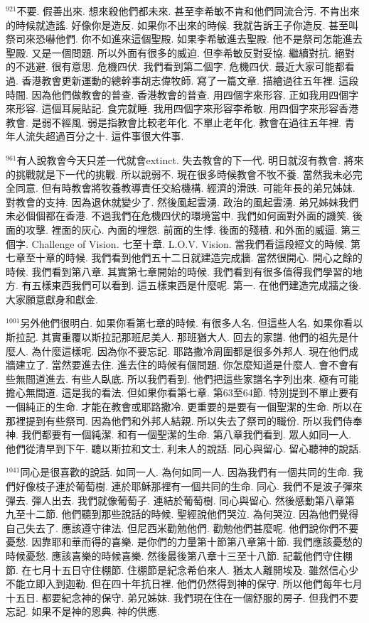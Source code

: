\documentclass{book}
\begin{document}
$^{921}$不要.
假善出來.
想來殺他們都未來.
甚至李希敏不肯和他們同流合污.
不肯出來的時候就造謠.
好像你是造反.
如果你不出來的時候.
我就告訴王子你造反.
甚至叫祭司來恐嚇他們.
你不如進來這個聖殿.
如果李希敏進去聖殿.
他不是祭司怎能進去聖殿.
又是一個問題.
所以外面有很多的威迫.
但李希敏反對妥協.
繼續對抗.
絕對的不逃避.
很有意思.
危機四伏.
我們看到第二個字.
危機四伏.
最近大家可能都看過.
香港教會更新運動的總幹事胡志偉牧師.
寫了一篇文章.
描繪過往五年裡.
這段時間.
因為他們做教會的普查.
香港教會的普查.
用四個字來形容.
正如我用四個字來形容.
這個耳屍貼記.
食完就睡.
我用四個字來形容李希敏.
用四個字來形容香港教會.
是弱不經風.
弱是指教會比較老年化.
不單止老年化.
教會在過往五年裡.
青年人流失超過百分之十.
這件事很大件事.

$^{961}$有人說教會今天只差一代就會extinct.
失去教會的下一代.
明日就沒有教會.
將來的挑戰就是下一代的挑戰.
所以說弱不.
現在很多時候教會不牧不養.
當然我未必完全同意.
但有時教會將牧養教導責任交給機構.
經濟的滑跌.
可能年長的弟兄姊妹.
對教會的支持.
因為退休就變少了.
然後風起雲湧.
政治的風起雲湧.
弟兄姊妹我們未必個個都在香港.
不過我們在危機四伏的環境當中.
我們如何面對外面的譏笑.
後面的攻擊.
裡面的灰心.
內面的埋怨.
前面的生悸.
後面的殘積.
和外面的威逼.
第三個字.
Challenge of Vision.
七至十章.
L.O.V. Vision.
當我們看這段經文的時候.
第七章至十章的時候.
我們看到他們五十二日就建造完成牆.
當然很開心.
開心之餘的時候.
我們看到第八章.
其實第七章開始的時候.
我們看到有很多值得我們學習的地方.
有五樣東西我們可以看到.
這五樣東西是什麼呢.
第一.
在他們建造完成牆之後.
大家願意獻身和獻金.

$^{1001}$另外他們很明白.
如果你看第七章的時候.
有很多人名.
但這些人名.
如果你看以斯拉記.
其實重覆以斯拉記那班尼美人.
那班猶大人.
回去的家譜.
他們的祖先是什麼人.
為什麼這樣呢.
因為你不要忘記.
耶路撒冷周圍都是很多外邦人.
現在他們成牆建立了.
當然要進去住.
進去住的時候有個問題.
你怎麼知道是什麼人.
會不會有些無間道進去.
有些人臥底.
所以我們看到.
他們把這些家譜名字列出來.
極有可能擔心無間道.
這是我的看法.
但如果你看第七章.
第63至64節.
特別提到不單止要有一個純正的生命.
才能在教會或耶路撒冷.
更重要的是要有一個聖潔的生命.
所以在那裡提到有些祭司.
因為他們和外邦人結親.
所以失去了祭司的職份.
所以我們侍奉神.
我們都要有一個純潔.
和有一個聖潔的生命.
第八章我們看到.
眾人如同一人.
他們從清早到下午.
聽以斯拉和文士.
利未人的說話.
同心與留心.
留心聽神的說話.

$^{1041}$同心是很喜歡的說話.
如同一人.
為何如同一人.
因為我們有一個共同的生命.
我們好像枝子連於葡萄樹.
連於耶穌那裡有一個共同的生命.
同心.
我們不是波子彈來彈去.
彈人出去.
我們就像葡萄子.
連結於葡萄樹.
同心與留心.
然後感動第八章第九至十二節.
他們聽到那些說話的時候.
聖經說他們哭泣.
為何哭泣.
因為他們覺得自己失去了.
應該遵守律法.
但尼西米勸勉他們.
勸勉他們甚麼呢.
他們說你們不要憂愁.
因靠耶和華而得的喜樂.
是你們的力量第十節第八章第十節.
我們應該憂愁的時候憂愁.
應該喜樂的時候喜樂.
然後最後第八章十三至十八節.
記載他們守住棚節.
在七月十五日守住棚節.
住棚節是紀念希伯來人.
猶太人離開埃及.
雖然信心少不能立即入到迦勒.
但在四十年抗日裡.
他們仍然得到神的保守.
所以他們每年七月十五日.
都要紀念神的保守.
弟兄姊妹.
我們現在住在一個舒服的房子.
但我們不要忘記.
如果不是神的恩典.
神的供應.
\end{document}
